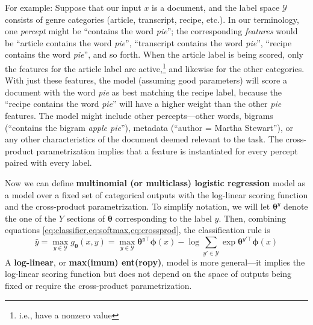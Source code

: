 \documentclass[11pt,letterpaper]{article}
\newcommand{\ensuretext}[1]{#1}
\newcommand{\nssmarker}{\ensuretext{\textcolor{magenta}{\ensuremath{^{\textsc{NS}}_{\textsc{S}}}}}}
\newcommand{\arkcomment}[3]{\ensuretext{\textcolor{#3}{[#1 #2]}}}
\newcommand{\nss}[1]{\arkcomment{\nssmarker}{#1}{magenta}}
\newcommand{\params}{\mathbf{\theta}}
\begin{document}
For example: Suppose that our input $x$ is a document, and the label space $\mathcal{Y}$ consists of genre categories ({\sc article}, {\sc transcript}, {\sc recipe}, etc.).
In our terminology, one {\em percept} might be ``contains the word \textit{pie}''; the corresponding {\em features} 
would be ``{\sc article} contains the word \textit{pie}'', ``{\sc transcript} contains the word \textit{pie}'', ``{\sc recipe} contains the word \textit{pie}'', 
and so forth. When the {\sc article} label is being scored, only the features for the {\sc article} label are active,\footnote{i.e., have a nonzero value} 
and likewise for the other categories. With just these features, the model (assuming good parameters) will score 
a document with the word \textit{pie} as best matching the {\sc recipe} label, because the 
``{\sc recipe} contains the word \textit{pie}'' will have a higher weight than the other \textit{pie} features.
The model might include other percepts---other words, bigrams (``contains the bigram \textit{apple pie}''), 
metadata (``author = Martha Stewart''), or any other characteristics of the document deemed relevant to the task.
The cross-product parametrization implies that a feature is instantiated for every percept paired with every label.


Now we can define {\bf multinomial (or multiclass) logistic regression} model 
as a model over a fixed set of categorical outputs with the log-linear scoring function and the cross-product parametrization.
To simplify notation, we will let $\boldsymbol{\theta}^y$ denote the one of the $Y$ sections of $\boldsymbol{\theta}$ 
corresponding to the label $y$. 
Then, combining equations \cref{eq:classifier,eq:softmax,eq:crossprod}, 
the classification rule is
\begin{equation}\label{eq:logistic}
\hat{y} = \max_{y\in\mathcal{Y}} g_\params(x,y) = \max_{y\in\mathcal{Y}} \boldsymbol{\theta}^{y\top} \boldsymbol{\phi}(x) - \log{\sum_{y'\in\mathcal{Y}}{\exp{\boldsymbol{\theta}^{y'\top} \boldsymbol{\phi}(x)}}}
\end{equation} 
A {\bf log-linear}, or {\bf max(imum) ent(ropy)}, model is more general---it implies the log-linear scoring function 
but does not depend on the space of outputs being fixed or require the cross-product parametrization.
\\
\end{document}
